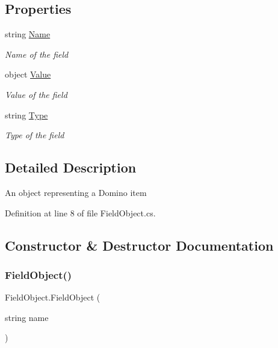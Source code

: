 \subsection*{Properties}
\begin{DoxyCompactItemize}
\item 
string \mbox{\hyperlink{class_field_object_ae5d972e96a3eca93407da8e8a89abfd1}{Name}}
\begin{DoxyCompactList}\small\item\em Name of the field \end{DoxyCompactList}\item 
object \mbox{\hyperlink{class_field_object_a9764fb1824cec95b82cd6ac0b4cd8919}{Value}}
\begin{DoxyCompactList}\small\item\em Value of the field \end{DoxyCompactList}\item 
string \mbox{\hyperlink{class_field_object_a370af2c26ae9c3e713b5d88b62a2a8f9}{Type}}
\begin{DoxyCompactList}\small\item\em Type of the field \end{DoxyCompactList}\end{DoxyCompactItemize}


\subsection{Detailed Description}
An object representing a Domino item 



Definition at line 8 of file Field\+Object.\+cs.



\subsection{Constructor \& Destructor Documentation}
\mbox{\label{class_field_object_a87d8d3f1a36d94dec64e8e467950074b}} 
\subsubsection{\texorpdfstring{Field\+Object()}{FieldObject()}}
{\footnotesize\ttfamily Field\+Object.\+Field\+Object (\begin{DoxyParamCaption}\item[{string}]{name }\end{DoxyParamCaption})}



